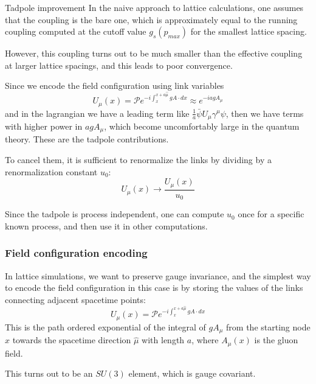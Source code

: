 \documentclass{beamer}
\begin{document}
\begin{frame}{Tadpole improvement}
    In the naive approach to lattice calculations, one assumes that the coupling is the bare one, which is approximately equal to the running coupling computed at the cutoff value $g_s(p_{max})$ for the smallest lattice spacing.

    However, this coupling turns out to be much smaller than the effective coupling at larger lattice spacings, and this leads to poor convergence.

    Since we encode the field configuration using link variables
    \begin{equation*}
        U_{\mu} (x) = \mathcal{P} e^{-i\int_x^{x+a\hat{\mu}} g A \cdot dx} \approx e^{-iagA_{\mu}}
    \end{equation*}
    and in the lagrangian we have a leading term like $\frac{1}{a}\bar{\psi}U_{\mu}\gamma^{\mu}\psi$, then we have terms with higher power in $agA_{\mu}$, which become uncomfortably large in the quantum theory. These are the tadpole contributions.

    To cancel them, it is sufficient to renormalize the links by dividing by a renormalization constant $u_0$:
    \begin{equation*}
        U_{\mu}(x) \rightarrow \frac{U_{\mu}(x)}{u_0}
    \end{equation*}

    Since the tadpole is process independent, one can compute $u_0$ once for a specific known process, and then use it in other computations.
\end{frame}

\begin{frame}[fragile]
\frametitle{Field configuration encoding}
In lattice simulations, we want to preserve gauge invariance, and the simplest way to encode the field configuration in this case is by storing the values of the links connecting adjacent spacetime points:
\begin{equation*}
    U_{\mu}(x) = \mathcal{P}e^{-i\int_x^{x+a\hat{\mu}} g A \cdot dx}
\end{equation*}
This is the path ordered exponential of the integral of $gA_{\mu}$ from the starting node $x$ towards the spacetime direction $\hat{\mu}$ with length $a$, where $A_{\mu}(x)$ is the gluon field.

This turns out to be an $SU(3)$ element, which is gauge covariant.
\end{frame}
\end{document}
